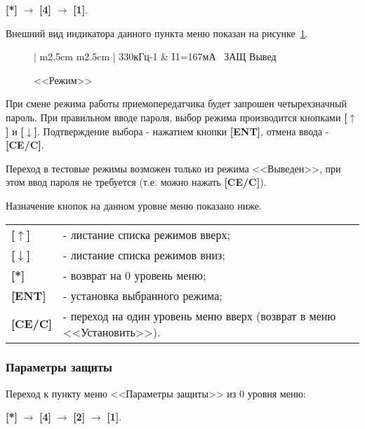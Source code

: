 \textbf{[*]} $\rightarrow$ \textbf{[4]} $\rightarrow$ \textbf{[1]}.

Внешний вид индикатора данного пункта меню показан на рисунке~\ref{fig:setup_regime}.
 
 \begin{figure}[H]
 	\centering
 	
	\begin{tabular}{| m{2.5cm}  m{2.5cm} |}
		\firsthline
		330кГц-1	& \raggedleft I1=167мА		\tabularnewline 
		 {~ЗАЩ}		\tabularnewline
		 {Вывед} 	\tabularnewline 
		 {}			\tabularnewline 
		\lasthline
	\end{tabular} 
	
	\caption{<<Режим>>}
	\label{fig:setup_regime}
\end{figure}

При смене режима работы приемопередатчика будет запрошен четырехзначный пароль. При правильном вводе пароля, выбор режима производится кнопками \textbf{[$\uparrow$]} и \textbf{[$\downarrow$]}. Подтверждение выбора - нажатием кнопки \textbf{[ENT]}, отмена ввода - \textbf{[CE/C]}.

Переход в тестовые режимы возможен только из режима <<Выведен>>, при этом ввод пароля не требуется (т.е. можно нажать \textbf{[CE/C]}).

Назначение кнопок на данном уровне меню показано ниже.
\begin{center}
	\begin{tabular}{p{2cm} p{15cm}}
		\textbf{[$\uparrow$]}  	& - листание списка режимов вверх; \tabularnewline
		\textbf{[$\downarrow$]} & - листание списка режимов вниз; \tabularnewline
		\textbf{[*]} 			& - возврат на 0 уровень меню; \tabularnewline
		\textbf{[ENT]} 			& - установка выбранного режима; \tabularnewline
		\textbf{[CE/C]} 		& - переход на один уровень меню вверх (возврат в меню <<Установить>>). \tabularnewline				
	\end{tabular}
\end{center} 


\subsubsection{Параметры защиты} \label{sssec:setup_param_def}

Переход к пункту меню <<Параметры защиты>> из 0 уровня меню:

\textbf{[*]} $\rightarrow$ \textbf{[4]} $\rightarrow$ \textbf{[2]} $\rightarrow$ \textbf{[1]}.


